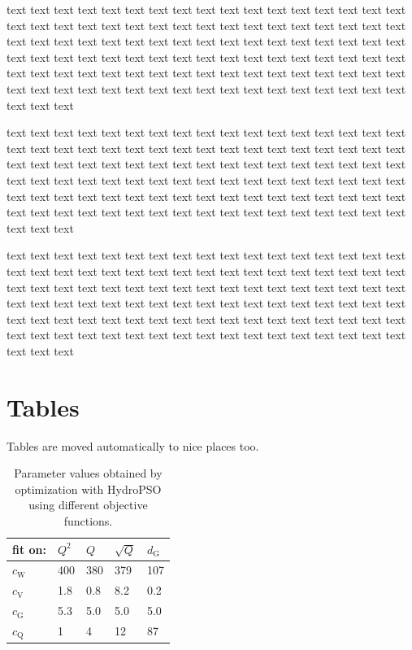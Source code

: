 \documentclass[twocolumn, 10pt, a4paper]{memoir}
\begin{document}
text text text text text text text text text text text text text text text text text text text text text
text text text text text text text text text text text text text text text text text text text text text
text text text text text text text text text text text text text text text text text text text text text
text text text text text text text text text text text text text text text text text text text text text
text text text text text text text text text text text text text text text text text text text text text

text text text text text text text text text text text text text text text text text text text text text
text text text text text text text text text text text text text text text text text text text text text
text text text text text text text text text text text text text text text text text text text text text
text text text text text text text text text text text text text text text text text text text text text
text text text text text text text text text text text text text text text text text text text text text

text text text text text text text text text text text text text text text text text text text text text
text text text text text text text text text text text text text text text text text text text text text
text text text text text text text text text text text text text text text text text text text text text
text text text text text text text text text text text text text text text text text text text text text
text text text text text text text text text text text text text text text text text text text text text

\section{Tables}

Tables are moved automatically to nice places too.

\begin{table}[t]
\caption{Parameter values obtained by optimization with HydroPSO using different objective functions.}
\label{tab: testtable}
\centering
\begin{tabular}{lllll}
\toprule
fit on:&$Q^2$&$Q$&$\sqrt{Q}$&$d_\mathrm{G}$\\
\midrule
$c_\mathrm{W}$&400&380&379&107\\
$c_\mathrm{V}$&1.8&0.8&8.2&0.2\\
$c_\mathrm{G}$&5.3&5.0&5.0&5.0\\
$c_\mathrm{Q}$&1&4&12&87\\
\bottomrule
\end{tabular}
\end{table} 
\end{document}
